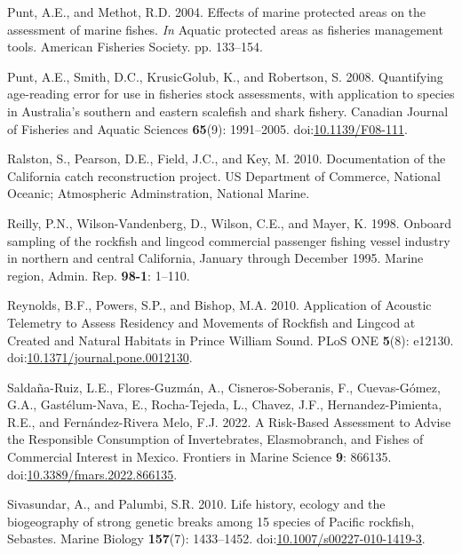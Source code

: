 \documentclass[11pt,
  english,
  letterpaper,
]{article}
\newlength{\cslhangindent}
\newenvironment{CSLReferences}[2] %
 {%
  \setlength{\parindent}{0pt}
  \ifodd #1 \everypar{\setlength{\hangindent}{\cslhangindent}}\ignorespaces\fi
  \ifnum #2 > 0
  \setlength{\parskip}{#2\baselineskip}
  \fi
 }%
 {}
\begin{document}
\begin{CSLReferences}{1}{0}
\leavevmode{}%
Punt, A.E., and Methot, R.D. 2004. Effects of marine protected areas on the assessment of marine fishes. \emph{In} Aquatic protected areas as fisheries management tools. {American} {Fisheries} {Society}. pp. 133--154.

\leavevmode{}%
Punt, A.E., Smith, D.C., KrusicGolub, K., and Robertson, S. 2008. Quantifying age-reading error for use in fisheries stock assessments, with application to species in {Australia}'s southern and eastern scalefish and shark fishery. Canadian Journal of Fisheries and Aquatic Sciences \textbf{65}(9): 1991--2005. doi:\href{https://doi.org/10.1139/F08-111}{10.1139/F08-111}.

\leavevmode{}%
Ralston, S., Pearson, D.E., Field, J.C., and Key, M. 2010. Documentation of the {California} catch reconstruction project. US Department of Commerce, National Oceanic; Atmospheric Adminstration, National Marine.

\leavevmode{}%
Reilly, P.N., Wilson-Vandenberg, D., Wilson, C.E., and Mayer, K. 1998. Onboard sampling of the rockfish and lingcod commercial passenger fishing vessel industry in northern and central {California}, {January} through {December} 1995. Marine region, Admin. Rep. \textbf{98-1}: 1--110.

\leavevmode{}%
Reynolds, B.F., Powers, S.P., and Bishop, M.A. 2010. Application of {Acoustic} {Telemetry} to {Assess} {Residency} and {Movements} of {Rockfish} and {Lingcod} at {Created} and {Natural} {Habitats} in {Prince} {William} {Sound}. PLoS ONE \textbf{5}(8): e12130. doi:\href{https://doi.org/10.1371/journal.pone.0012130}{10.1371/journal.pone.0012130}.

\leavevmode{}%
Saldaña-Ruiz, L.E., Flores-Guzmán, A., Cisneros-Soberanis, F., Cuevas-Gómez, G.A., Gastélum-Nava, E., Rocha-Tejeda, L., Chavez, J.F., Hernandez-Pimienta, R.E., and Fernández-Rivera Melo, F.J. 2022. A {Risk}-{Based} {Assessment} to {Advise} the {Responsible} {Consumption} of {Invertebrates}, {Elasmobranch}, and {Fishes} of {Commercial} {Interest} in {Mexico}. Frontiers in Marine Science \textbf{9}: 866135. doi:\href{https://doi.org/10.3389/fmars.2022.866135}{10.3389/fmars.2022.866135}.

\leavevmode{}%
Sivasundar, A., and Palumbi, S.R. 2010. Life history, ecology and the biogeography of strong genetic breaks among 15 species of {Pacific} rockfish, {Sebastes}. Marine Biology \textbf{157}(7): 1433--1452. doi:\href{https://doi.org/10.1007/s00227-010-1419-3}{10.1007/s00227-010-1419-3}.


\end{CSLReferences}
\end{document}
